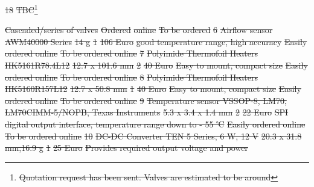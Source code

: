 \documentclass[a4paper,12pt,twoside]{article}
\providecommand{\DIFdeltex}[1]{{\protect\color{red}\sout{#1}}}                      %
\providecommand{\DIFdel}[1]{\texorpdfstring{\DIFdeltex{#1}}{}} %
\begin{document}
\begin{landscape}
\DIFdel{18 }%
\DIFdel{TBC}\footnote{\DIFdel{Quotation request has been sent. Valves are estimated to be around }%
} %
\addtocounter{footnote}{-1}%
\DIFdel{Cascaded/series of valves }%
\DIFdel{Ordered }%
\DIFdel{online}%
\DIFdel{To be ordered }%
\DIFdel{6 }%
\DIFdel{Airflow sensor AWM40000 Series }%
\DIFdel{14 g }%
\DIFdel{1 }%
\DIFdel{106 Euro }%
\DIFdel{good temperature range, high accuracy }%
\DIFdel{Easily ordered online }%
\DIFdel{To be ordered online }%
\DIFdel{7 }%
\DIFdel{Polyimide Thermofoil Heaters HK5161R78.4L12 }%
\DIFdel{12.7 x 101.6 mm }%
\DIFdel{2 }%
\DIFdel{40 Euro }%
\DIFdel{Easy to mount, compact size }%
\DIFdel{Easily ordered online }%
\DIFdel{To be ordered online }%
\DIFdel{8 }%
\DIFdel{Polyimide Thermofoil Heaters HK5160R157L12 }%
\DIFdel{12.7 x 50.8 mm }%
\DIFdel{1 }%
\DIFdel{40 Euro }%
\DIFdel{Easy to mount, compact size }%
\DIFdel{Easily ordered online }%
\DIFdel{To be ordered online }%
\DIFdel{9 }%
\DIFdel{Temperature sensor VSSOP-8, LM70, LM70CIMM-5/NOPB, Texas Instruments }%
\DIFdel{5.3 x 3.4 x 1.4 mm }%
\DIFdel{2 }%
\DIFdel{22 Euro }%
\DIFdel{SPI digital output interface, temperature range down to - 55 ℃ }%
\DIFdel{Easily ordered online }%
\DIFdel{To be ordered online }%
\DIFdel{10 }%
\DIFdel{DC-DC Converter TEN 5 Series, 6 W, 12 V }%
\DIFdel{20.3 x 31.8 mm,16.9 g }%
\DIFdel{1 }%
\DIFdel{25 Euro }%
\DIFdel{Provides required output voltage and power }%

\end{landscape}
\end{document}
